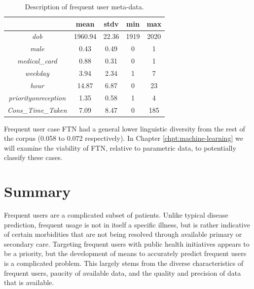\begin{table}[h]
\setlength{\tabcolsep}{8pt}
\centering
\caption{Description of frequent user meta-data.}
\label{table:frequent-users}
\begin{tabular}{@{}c|cccc@{}}
\toprule
\multicolumn{1}{l|}{}        & \textbf{mean} & \textbf{stdv} & \textbf{min} & \textbf{max} \\ \midrule
\textit{dob}                 & 1960.94      & 22.36        & 1919         & 2020         \\
\textit{male}                & 0.43      & 0.49        & 0            & 1            \\
\textit{medical\_card}       & 0.88      & 0.31        & 0            & 1            \\
\textit{weekday}             & 3.94      & 2.34        & 1            & 7            \\
\textit{hour}                & 14.87      & 6.87        & 0            & 23           \\
\textit{priorityonreception} & 1.35      & 0.58        & 1            & 4            \\
\textit{Cons\_Time\_Taken}   & 7.09      & 8.47        & 0            & 185          \\ \bottomrule
\end{tabular}
\end{table}




Frequent user case FTN had a general lower linguistic diversity from the rest of the corpus (0.058 to 0.072 respectively). In Chapter \ref{chpt:machine-learning} we will examine the viability of FTN, relative to parametric data, to potentially classify these cases.  


\section{Summary}

Frequent users are a complicated subset of patients. Unlike typical disease prediction, frequent usage is not in itself a specific illness, but is rather indicative of certain morbidities that are not being resolved through available primary or secondary care. Targeting frequent users with public health initiatives appears to be a priority, but the development of means to accurately predict frequent users is a complicated problem. This largely stems from the diverse characteristics of frequent users, paucity of available data, and the quality and precision of data that is available.  

